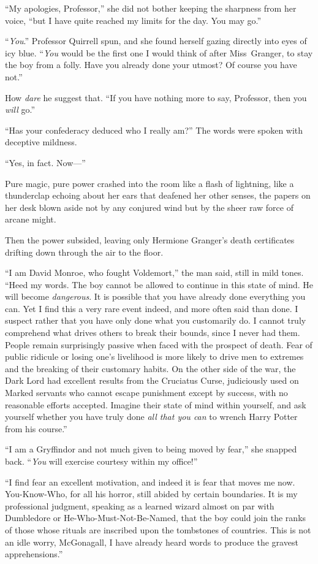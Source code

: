 “My apologies, Professor,” she did not bother keeping the sharpness from her
voice, “but I have quite reached my limits for the day. You may go.”

“\emph{You}.” Professor Quirrell spun, and she found herself gazing directly
into eyes of icy blue. “\emph{You} would be the first one I would think of
after Miss~Granger, to stay the boy from a folly. Have you already done your
utmost? Of course you have not.”

How \emph{dare} he suggest that. “If you have nothing more to say, Professor,
then you \emph{will} go.”

“Has your confederacy deduced who I really am?” The words were spoken with
deceptive mildness.

“Yes, in fact. Now—”

Pure magic, pure power crashed into the room like a flash of lightning, like a
thunderclap echoing about her ears that deafened her other senses, the papers
on her desk blown aside not by any conjured wind but by the sheer raw force of
arcane might.

Then the power subsided, leaving only Hermione Granger’s death certificates
drifting down through the air to the floor.

“I am David Monroe, who fought Voldemort,” the man said, still in mild tones.
“Heed my words. The boy cannot be allowed to continue in this state of mind. He
will become \emph{dangerous}. It is possible that you have already done
everything you can. Yet I find this a very rare event indeed, and more often
said than done. I suspect rather that you have only done what you customarily
do. I cannot truly comprehend what drives others to break their bounds, since I
never had them. People remain surprisingly passive when faced with the prospect
of death. Fear of public ridicule or losing one’s livelihood is more likely to
drive men to extremes and the breaking of their customary habits. On the other
side of the war, the Dark Lord had excellent results from the Cruciatus Curse,
judiciously used on Marked servants who cannot escape punishment except by
success, with no reasonable efforts accepted. Imagine their state of mind
within yourself, and ask yourself whether you have truly done \emph{all that
you can} to wrench Harry Potter from his course.”

“I am a Gryffindor and not much given to being moved by fear,” she snapped
back. “\emph{You} will exercise courtesy within my office!”

“I find fear an excellent motivation, and indeed it is fear that moves me now.
You-Know-Who, for all his horror, still abided by certain boundaries. It is my
professional judgment, speaking as a learned wizard almost on par with
Dumbledore or He-Who-Must-Not-Be-Named, that the boy could join the ranks of
those whose rituals are inscribed upon the tombstones of countries. This is not
an idle worry, McGonagall, I have already heard words to produce the gravest
apprehensions.”

